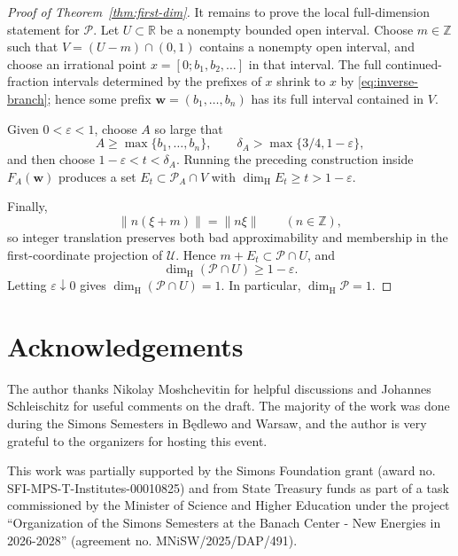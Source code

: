 \documentclass[11pt]{amsart}
\newcommand{\R}{\mathbb R}
\newcommand{\Z}{\mathbb Z}
\newcommand{\eps}{\varepsilon}
\newcommand{\dimH}{\dim_{\mathrm H}}
\newcommand{\cP}{\mathcal P}
\begin{document}
\begin{proof}[Proof of Theorem~\ref{thm:first-dim}]
It remains to prove the local full-dimension statement for $\cP$.  Let
$U\subset\R$ be a nonempty bounded open interval.  Choose $m\in\Z$ such that
$V=(U-m)\cap(0,1)$ contains a nonempty open interval, and choose an irrational
point $x=[0;b_1,b_2,\ldots]$ in that interval.  The full continued-fraction
intervals determined by the prefixes of $x$ shrink to $x$ by
\eqref{eq:inverse-branch}; hence some prefix
$\mathbf{w}=(b_1,\ldots,b_n)$ has its full interval contained in $V$.

Given $0<\eps<1$, choose $A$ so large that
$$
 A\ge\max\{b_1,\ldots,b_n\},
 \qquad
 \delta_A>\max\{3/4,1-\eps\},
$$
and then choose $1-\eps<t<\delta_A$.  Running the preceding construction
inside $F_A(\mathbf{w})$ produces a set
$E_t\subset\cP_A\cap V$ with $\dimH E_t\ge t>1-\eps$.

Finally,
$$
 \|n(\xi+m)\|=\|n\xi\|\qquad(n\in\Z),
$$
so integer translation preserves both bad approximability and membership in
the first-coordinate projection of $\mathcal U$.  Hence
$m+E_t\subset\cP\cap U$, and
$$
 \dimH(\cP\cap U)\ge1-\eps.
$$
Letting $\eps\downarrow0$ gives $\dimH(\cP\cap U)=1$.  In particular,
$\dimH\cP=1$.
\end{proof}


\section*{Acknowledgements}
The author thanks Nikolay Moshchevitin for helpful discussions and Johannes Schleischitz for useful comments on the draft. The majority of the work was done during the Simons Semesters in Będlewo and Warsaw, and the author is very grateful to the organizers for hosting this event.

This work was partially supported by the Simons Foundation grant (award no. SFI-MPS-T-Institutes-00010825) and from State Treasury funds as part of a task commissioned by the Minister of Science and Higher Education under the project “Organization of the Simons Semesters at the Banach Center - New Energies in 2026-2028” (agreement no. MNiSW/2025/DAP/491).
\end{document}
